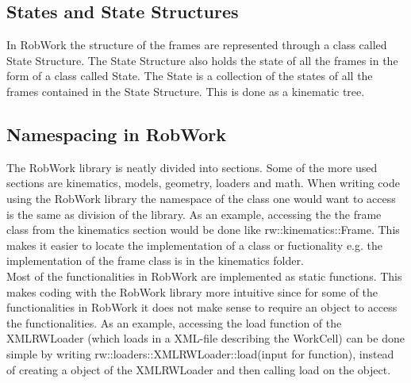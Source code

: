 \subsection{States and State Structures}
In RobWork the structure of the frames are represented through a class called State Structure. The State Structure also holds the state of all the frames in the form of a class called State. The State is a collection of the states of all the frames contained in the State Structure. This is done as a kinematic tree.


\subsection{Namespacing in RobWork}
The RobWork library is neatly divided into sections. Some of the more used sections are kinematics, models, geometry, loaders and math. When writing code using the RobWork library the namespace of the class one would want to access is the same as division of the library. As an example, accessing the the frame class from the kinematics section would be done like rw::kinematics::Frame. This makes it easier to locate the implementation of a class or fuctionality e.g. the implementation of the frame class is in the kinematics folder.\\

Most of the functionalities in RobWork are implemented as static functions. This makes coding with the RobWork library more intuitive since for some of the functionalities in RobWork it does not make sense to require an object to access the functionalities. As an example, accessing the load function of the XMLRWLoader (which loads in a XML-file describing the WorkCell) can be done simple by writing rw::loaders::XMLRWLoader::load(input for function), instead of creating a object of the XMLRWLoader and then calling load on the object.


